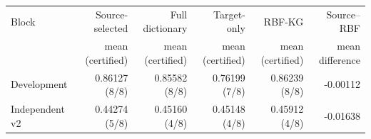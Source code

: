 \begin{tabular}{lrrrrr}
\toprule
Block & Source-selected & Full dictionary & Target-only & RBF-KG & Source--RBF\\
 & mean (certified) & mean (certified) & mean (certified) & mean (certified) & mean difference\\
\midrule
Development & 0.86127 (8/8) & 0.85582 (8/8) & 0.76199 (7/8) & 0.86239 (8/8) & -0.00112 \\
Independent v2 & 0.44274 (5/8) & 0.45160 (4/8) & 0.45148 (4/8) & 0.45912 (4/8) & -0.01638 \\
\bottomrule
\end{tabular}
